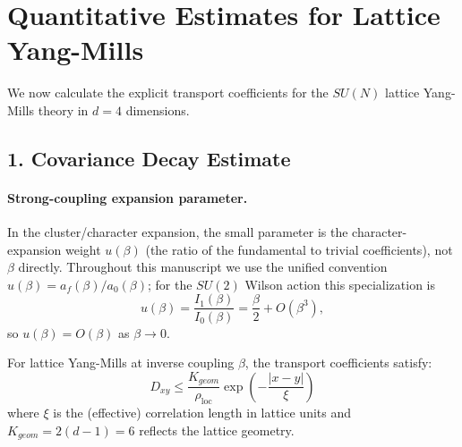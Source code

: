 \section{Quantitative Estimates for Lattice Yang-Mills}

We now calculate the explicit transport coefficients for the $SU(N)$ lattice Yang-Mills theory in $d=4$ dimensions.

\subsection{1. Covariance Decay Estimate}

\paragraph{Strong-coupling expansion parameter.}
In the cluster/character expansion, the small parameter is the character-expansion weight $u(\beta)$ (the ratio of the fundamental to trivial coefficients), not $\beta$ directly.
Throughout this manuscript we use the unified convention $u(\beta)=a_f(\beta)/a_0(\beta)$; for the $SU(2)$ Wilson action this specialization is
\[
u(\beta)=\frac{I_1(\beta)}{I_0(\beta)}=\frac{\beta}{2}+O(\beta^3),
\]
so $u(\beta)=O(\beta)$ as $\beta\to 0$.

\begin{theorem}
For lattice Yang-Mills at inverse coupling $\beta$, the transport coefficients satisfy:
\begin{equation}
D_{xy} \leq \frac{K_{geom}}{\rho_{\text{loc}}} \exp\left( -\frac{|x-y|}{\xi} \right)
\end{equation}
where $\xi$ is the (effective) correlation length in lattice units and $K_{geom} = 2(d-1) = 6$ reflects the lattice geometry.
\end{theorem}

